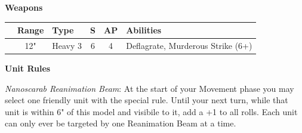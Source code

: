 \begin{minipage}[t]{0.72\textwidth}
	
	\vspace*{2em}
	\textbf{Weapons}
	
	\begin{tabular}{L{90 pt} c C{40pt} *{2}{c} >{\raggedright\arraybackslash}p{130pt}}
		& Range & Type & S & AP & Abilities \\
		\hline
		 & 12" & Heavy 3 & 6 & 4 & Deflagrate, Murderous Strike (6+) \\
	\end{tabular}

	\vspace*{2em}
	\textbf{Unit Rules}
	
	\textit{Nanoscarab Reanimation Beam}: At the start of your Movement phase you may select one friendly unit with the  special rule. Until your next turn, while that unit is within 6" of this model and visibile to it, add a +1 to all  rolls. Each unit can only ever be targeted by one Reanimation Beam at a time.
\end{minipage}


\newpage

